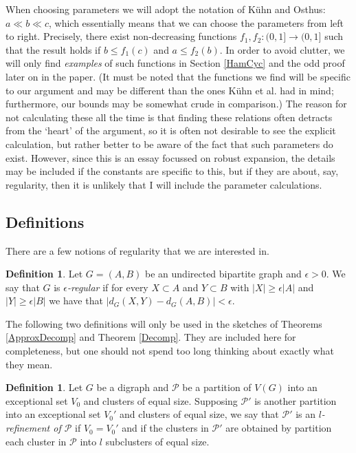 \documentclass[10pt,letterpaper, reqno]{amsart}
\theoremstyle{definition}
\newtheorem{defn}[thm]{Definition}
\numberwithin{equation}{section}
\begin{document}
When choosing parameters we will adopt the notation of K\"{u}hn and Osthus: $a \ll b \ll c$, which essentially means that we can choose the parameters from left to right. Precisely, there exist non-decreasing functions $f_1, f_2 : (0,1] \to (0,1]$ such that the result holds if $b \leq f_1(c)$ and $a \leq f_2(b)$. In order to avoid clutter, we will only find \textit{examples} of such functions in Section \ref{HamCyc} and the odd proof later on in the paper. (It must be noted that the functions we find will be specific to our argument and may be different than the ones K\"{u}hn et al. had in mind; furthermore, our bounds may be somewhat crude in comparison.) The reason for not calculating these all the time is that finding these relations often detracts from the `heart' of the argument, so it is often not desirable to see the explicit calculation, but rather better to be aware of the fact that such parameters do exist. However, since this is an essay focussed on robust expansion, the details may be included if the constants are specific to this, but if they are about, say, regularity, then it is unlikely that I will include the parameter calculations. 

\subsection{Definitions} There are a few notions of regularity that we are interested in. 
\begin{defn}
	Let $G=(A,B)$ be an undirected bipartite graph and $\epsilon >0$. We say that $G$ is \textit{$\epsilon$-regular} if for every $X \subset A$ and $Y \subset B$ with $|X| \geq \epsilon|A|$ and $|Y| \geq \epsilon|B|$ we have that $|d_G(X,Y) - d_G(A,B)| < \epsilon$. 
\end{defn}

\noindent The following two definitions will only be used in the sketches of Theorems \ref{ApproxDecomp} and Theorem \ref{Decomp}. They are included here for completeness, but one should not spend too long thinking about exactly what they mean. 

\begin{defn}
	Let $G$ be a digraph and $\mathcal{P}$ be a partition of $V(G)$ into an exceptional set $V_0$ and clusters of equal size. Supposing $\mathcal{P}'$ is another partition into an exceptional set $V_0'$ and clusters of equal size, we say that $\mathcal{P}'$ is an \textit{$l$-refinement of $\mathcal{P}$} if $V_0=V_0'$ and if the clusters in $\mathcal{P}'$ are obtained by partition each cluster in $\mathcal{P}$ into $l$ subclusters of equal size.
\end{defn}
\end{document}
